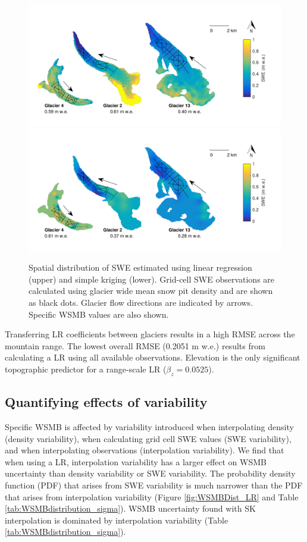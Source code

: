 \documentclass[review,oneside, letterpaper]{igs}
\begin{document}
\begin{figure}
	\centering
	\includegraphics[width =\textwidth]{LR_map.pdf}\\
    \includegraphics[width =\textwidth]{SK_map.pdf}\\
	\caption{Spatial distribution of SWE estimated using linear regression (upper) and simple kriging (lower). Grid-cell SWE observations are calculated using glacier wide mean snow pit density and are shown as black dots. Glacier flow directions are indicated by arrows. Specific WSMB values are also shown.}
	\label{fig:LR_SK_map}
\end{figure}

Transferring LR coefficients between glaciers results in a high RMSE across the mountain range. The lowest overall RMSE (0.2051 m w.e.) results from calculating a LR using all available observations. Elevation is the only significant topographic predictor for a range-scale LR ($\beta_z=0.0525$).


\subsection{Quantifying effects of variability}

Specific WSMB is affected by variability introduced when interpolating density (density variability), when calculating grid cell SWE values (SWE variability), and when interpolating observations (interpolation variability). We find that when using a LR, interpolation variability has a larger effect on WSMB uncertainty than density variability or SWE variability. The probability density function (PDF) that arises from SWE variability is much narrower than the PDF that arises from interpolation variability (Figure \ref{fig:WSMBDist_LR} and Table \ref{tab:WSMBdistribution_sigma}). WSMB uncertainty found with SK interpolation is dominated by interpolation variability (Table \ref{tab:WSMBdistribution_sigma}).  
\end{document}
